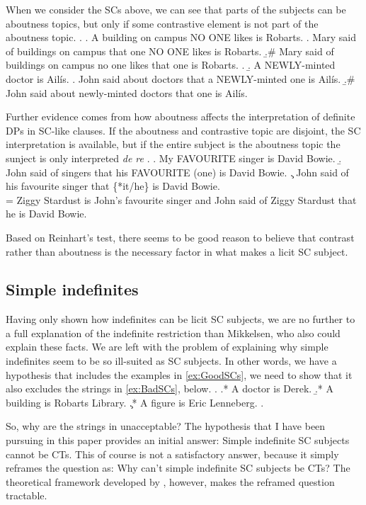 \documentclass[GPFinal]{subfiles}
\begin{document}
When we consider the SCs above, we can see that parts of the subjects can be aboutness topics, but only if some contrastive element is not part of the aboutness topic.
\ex.
\a. A building on campus NO ONE likes is Robarts.
\a. Mary said of buildings on campus that one NO ONE likes is Robarts.
\b.\# Mary said of buildings on campus no one likes that one is Robarts.
\z.
\b. A NEWLY-minted doctor is Ail\'is.
\a. John said about doctors that a NEWLY-minted one is Ail\'is.
\b.\# John said about newly-minted doctors that one is Ail\'is.

Further evidence comes from how aboutness affects the interpretation of definite DPs in SC-like clauses.
If the aboutness and contrastive topic are disjoint, the SC interpretation is available, but if the entire subject is the aboutness topic the sunject is only interpreted \textit{de re}
\ex. 
\a. My FAVOURITE singer is David Bowie.
\b. John said of singers that his FAVOURITE (one) is David Bowie.
\c. John said of his favourite singer that \{*it/he\} is David Bowie.\\
= Ziggy Stardust is John's favourite singer and John said of Ziggy Stardust that he is David Bowie.

Based on Reinhart's test, there seems to be good reason to believe that contrast rather than aboutness is the necessary factor in what makes a licit SC subject.

\subsection{Simple indefinites}
Having only shown how indefinites can be licit SC subjects, we are no further to a full explanation of the indefinite restriction than Mikkelsen, who also could explain these facts.
We are left with the problem of explaining why simple indefinites seem to be so ill-suited as SC subjects.
In other words, we have a hypothesis that includes the examples in \ref{ex:GoodSCs}, we need to show that it also excludes the strings in \ref{ex:BadSCs}, below.
\ex.\label{ex:BadSCs}
\a.* A doctor is Derek.
\b.* A building is Robarts Library.
\c.* A figure is Eric Lenneberg.
\z.

So, why are the strings in \Last unacceptable?
The hypothesis that I have been pursuing in this paper provides an initial answer: Simple indefinite SC subjects cannot be CTs.
This of course is not a satisfactory answer, because it simply reframes the question as: Why can't simple indefinite SC subjects be CTs?
The theoretical framework developed by \textcite{rooth1992theory,roberts2012information,buring2003d,buringforthcomingtopic}, however, makes the reframed question tractable.
\end{document}

